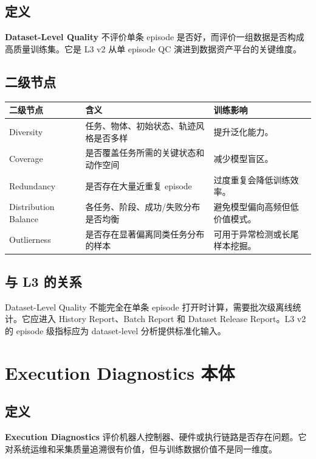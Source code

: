 \documentclass[UTF8,zihao=-4,oneside,openany]{ctexrep}
\newcommand{\Term}[1]{\textbf{#1}}
\begin{document}
\subsection{定义}

\Term{Dataset-Level Quality} 不评价单条 episode 是否好，而评价一组数据是否构成高质量训练集。它是 L3 v2 从单 episode QC 演进到数据资产平台的关键维度。

\subsection{二级节点}

\begin{longtable}{L{3.3cm} L{5cm} L{5.4cm}}
\toprule
二级节点 & 含义 & 训练影响 \\
\midrule
Diversity & 任务、物体、初始状态、轨迹风格是否多样 & 提升泛化能力。 \\
Coverage & 是否覆盖任务所需的关键状态和动作空间 & 减少模型盲区。 \\
Redundancy & 是否存在大量近重复 episode & 过度重复会降低训练效率。 \\
Distribution Balance & 各任务、阶段、成功/失败分布是否均衡 & 避免模型偏向高频但低价值模式。 \\
Outlierness & 是否存在显著偏离同类任务分布的样本 & 可用于异常检测或长尾样本挖掘。 \\
\bottomrule
\end{longtable}

\subsection{与 L3 的关系}

Dataset-Level Quality 不能完全在单条 episode 打开时计算，需要批次级离线统计。它应进入 History Report、Batch Report 和 Dataset Release Report。L3 v2 的 episode 级指标应为 dataset-level 分析提供标准化输入。

\section{Execution Diagnostics 本体}

\subsection{定义}

\Term{Execution Diagnostics} 评价机器人控制器、硬件或执行链路是否存在问题。它对系统运维和采集质量追溯很有价值，但与训练数据价值不是同一维度。
\end{document}
